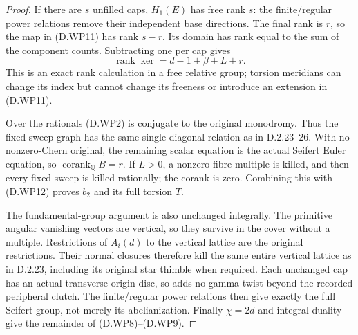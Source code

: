 \begin{proof}
If there are $s$ unfilled caps, $H_1(E)$ has free
rank $s$: the finite/regular power relations
remove their independent base directions.
The final rank is $r$, so the map in (D.WP11)
has rank $s-r$. Its domain has rank equal to
the sum of the component counts. Subtracting
one per cap gives
\[
 \operatorname{rank}\ker
   =d-1+\beta+L+r.                                        \tag{D.WP12}
\]
This is an exact rank calculation in a free
relative group; torsion meridians can change
its index but cannot change its freeness or
introduce an extension in (D.WP11).

Over the rationals (D.WP2) is conjugate to the
original monodromy. Thus the fixed-sweep graph
has the same single diagonal relation as in
D.2.23--26. With no nonzero-Chern original,
the remaining scalar equation is the actual
Seifert Euler equation, so
$\operatorname{corank}_{\mathbb Q}B=r$.
If $L>0$, a nonzero fibre multiple is killed,
and then every fixed sweep is killed rationally;
the corank is zero. Combining this with
(D.WP12) proves $b_2$ and its full torsion $T$.

The fundamental-group argument is also unchanged
integrally. The primitive angular vanishing
vectors are vertical, so they survive in the
cover without a multiple. Restrictions of
$A_i(d)$ to the vertical lattice are the
original restrictions. Their normal closures
therefore kill the same entire vertical
lattice as in D.2.23, including its original
star thimble when required. Each unchanged
cap has an actual transverse origin disc, so
adds no gamma twist beyond the recorded
peripheral clutch. The finite/regular power
relations then give exactly the full Seifert
group, not merely its abelianization.
Finally $\chi=2d$ and integral duality give
the remainder of (D.WP8)--(D.WP9).
\end{proof}
